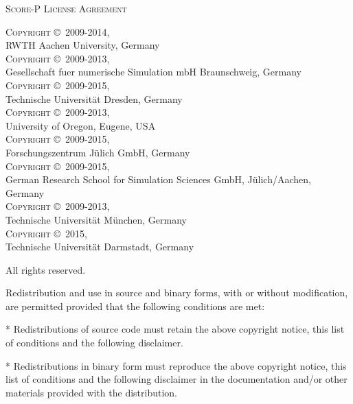 \begin{center}
  \textsc{\Large Score-P License Agreement}
\end{center}

{\small
\textsc{Copyright \copyright\, 2009-2014,} \\
\hspace*{10mm}RWTH Aachen University, Germany \\
\textsc{Copyright \copyright\, 2009-2013,} \\
\hspace*{10mm}Gesellschaft fuer numerische Simulation mbH Braunschweig, Germany \\
\textsc{Copyright \copyright\, 2009-2015,} \\
\hspace*{10mm}Technische Universit\"{a}t Dresden, Germany \\
\textsc{Copyright \copyright\, 2009-2013,} \\
\hspace*{10mm}University of Oregon, Eugene, USA \\
\textsc{Copyright \copyright\, 2009-2015,} \\
\hspace*{10mm}Forschungszentrum J\"{u}lich GmbH, Germany \\
\textsc{Copyright \copyright\, 2009-2015,} \\
\hspace*{10mm}German Research School for Simulation Sciences GmbH, J\"{u}lich/Aachen, Germany \\
\textsc{Copyright \copyright\, 2009-2013,} \\
\hspace*{10mm}Technische Universit\"{a}t M\"{u}nchen, Germany \\
\textsc{Copyright \copyright\, 2015,} \\
\hspace*{10mm}Technische Universit\"{a}t Darmstadt, Germany

All rights reserved.
\vfill

Redistribution and use in source and binary forms, with or without
modification, are permitted provided that the following conditions are
met:

* Redistributions of source code must retain the above copyright
  notice, this list of conditions and the following disclaimer.

* Redistributions in binary form must reproduce the above copyright
  notice, this list of conditions and the following disclaimer in the
  documentation and/or other materials provided with the distribution.

}
